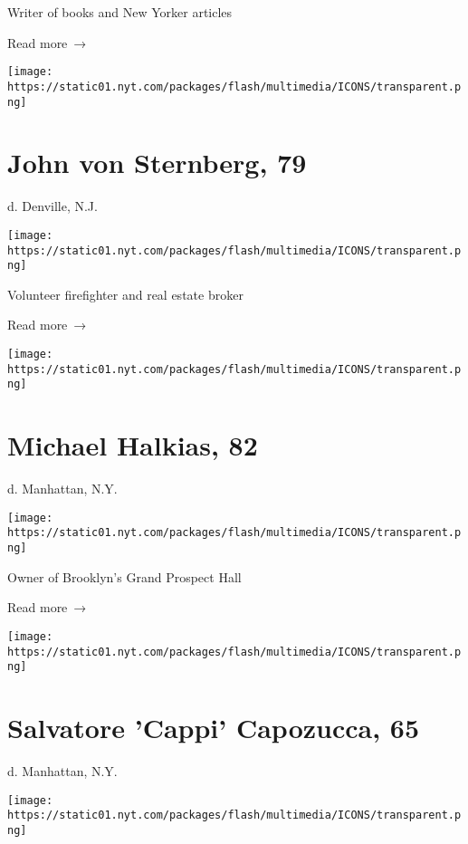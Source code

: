 Writer of books and New Yorker articles

 Read more~→

\href{https://www.nytimes.com/2020/05/26/obituaries/john-von-sternberg-dead-coronavirus.html}{}

\texttt{[image: https://static01.nyt.com/packages/flash/multimedia/ICONS/transparent.png]}

\hypertarget{john-von-sternberg-79}{%
\section{John von Sternberg, 79}\label{john-von-sternberg-79}}

d. Denville, N.J.

\texttt{[image: https://static01.nyt.com/packages/flash/multimedia/ICONS/transparent.png]}

Volunteer firefighter and real estate broker

 Read more~→

\href{https://www.nytimes.com/2020/05/24/obituaries/michael-halkias-dead-coronavirus.html}{}

\texttt{[image: https://static01.nyt.com/packages/flash/multimedia/ICONS/transparent.png]}

\hypertarget{michael-halkias-82}{%
\section{Michael Halkias, 82}\label{michael-halkias-82}}

d. Manhattan, N.Y.

\texttt{[image: https://static01.nyt.com/packages/flash/multimedia/ICONS/transparent.png]}

Owner of Brooklyn's Grand Prospect Hall

 Read more~→

\href{https://www.nytimes.com/2020/05/24/nyregion/sal-capozucca-dead-coronavirus.html}{}

\texttt{[image: https://static01.nyt.com/packages/flash/multimedia/ICONS/transparent.png]}

\hypertarget{salvatore-cappi-capozucca-65}{%
\section{Salvatore 'Cappi' Capozucca,
65}\label{salvatore-cappi-capozucca-65}}

d. Manhattan, N.Y.

\texttt{[image: https://static01.nyt.com/packages/flash/multimedia/ICONS/transparent.png]}


